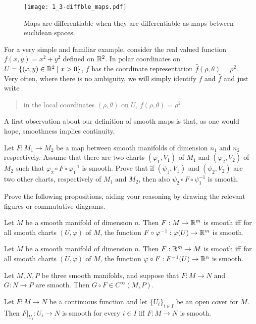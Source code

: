 \begin{figure}[htp]
	\centering
	\texttt{[image: 1\_3-diffble\_maps.pdf]}
	\caption{Maps are differentiable when they are differentiable as maps between euclidean spaces.}
	\label{fig:1.3-differentiable_maps}
\end{figure}

For a very simple and familiar example, consider the real valued function $f(x,y)= x^2+y^2$ defined on $\mathbb{R}^2$.
In polar coordinates on $U=\{(x,y)\in\mathbb{R}^2\mid x>0\}$, $f$ has the coordinate representation $\hat f (\rho, \theta) = \rho^2$.
Very often, where there is no ambiguity, we will simply identify $f$ and $\hat f$ and just write
\begin{quote}
	in the local coordinates $(\rho,\theta)$ on $U$, $f(\rho,\theta) = \rho^2$.
\end{quote}

A first observation about our definition of smooth maps is that, as one would hope, smoothness implies continuity.
%
\begin{exercise}
	Let $F:M_1\to M_2$ be a map between smooth manifolds of dimension $n_1$ and $n_2$ respectively.
	Assume that there are two charts $(\varphi_1, V_1)$ of $M_1$ and $(\varphi_2, V_2)$ of $M_2$ such that
	$\varphi_2\circ F\circ \varphi_1^{-1}$ is smooth.
	Prove that if $(\psi_1, V_1)$ and $(\psi_2, V_2)$ are two other charts,
	respectively of $M_1$ and $M_2$, then also $\psi_2\circ F\circ \psi_1^{-1}$ is smooth.
\end{exercise}
%
\begin{exercise}
	Prove the following propositions, aiding your reasoning by drawing the relevant figures or commutative diagrams.
	\begin{proposition}
		Let $M$ be a smooth manifold of dimension $n$.
		Then $F:M\to\mathbb{R}^m$ is smooth iff for all smooth charts $(U,\varphi)$ of $M$, the function $F\circ\varphi^{-1}:\varphi(U)\to\mathbb{R}^m$ is smooth.
	\end{proposition}
	\begin{proposition}
		Let $M$ be a smooth manifold of dimension $n$.
		Then $F:\mathbb{R}^m\to M$ is smooth iff for all smooth charts $(U,\varphi)$ of $M$, the function $\varphi\circ F:F^{-1}(U)\to\mathbb{R}^n$ is smooth.
	\end{proposition}
	\begin{proposition}
		Let $M, N, P$ be three smooth manifolds, and suppose that $F:M\to N$ and $G:N\to P$ are smooth.
		Then $G\circ F\in C^\infty(M, P)$.
	\end{proposition}

	\begin{proposition}\label{prop:smoothlocal}
		Let $F:M\to N$ be a continuous function and let $\{U_i\}_{i\in I}$ be an open cover for $M$. Then $F|_{U_i}:U_i \to N$ is smooth for every $i\in I$ iff $F:M\to N$ is smooth.
	\end{proposition}
\end{exercise}

